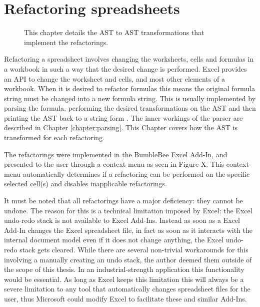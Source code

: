 \chapter{Refactoring spreadsheets}
\label{chapter:implementingrefactorings}

\noindent
\begin{figure}[h!]
\hspace*{0.003\textwidth}

\caption{This chapter details the AST to AST transformations that implement the refactorings.}
\end{figure}

Refactoring a spreadsheet involves changing the worksheets, cells and formulas in a workbook in such a way that the desired change is performed.
Excel provides an API to change the worksheet and cells, and most other elements of a workbook.
When it is desired to refactor formulas this means the original formula string must be changed into a new formula string.
This is usually implemented by parsing the formula, performing the desired transformations on the AST and then printing the AST back to a string form \cite{fowler1999refactoring}.
The inner workings of the parser are described in Chapter \ref{chapter:parsing}.
This Chapter covers how the AST is transformed for each refactoring.

The refactorings were implemented in the BumbleBee Excel Add-In, and presented to the user through a context menu as seen in Figure X.
This context-menu automatically determines if a refactoring can be performed on the specific selected cell(s) and disables inapplicable refactorings.

It must be noted that all refactorings have a major deficiency: they cannot be undone. \fw
The reason for this is a technical limitation imposed by Excel: the Excel undo-redo stack is not available to Excel Add-Ins.
Instead as soon as a Excel Add-In changes the Excel spreadsheet file, in fact as soon as it interacts with the internal document model even if it does not change anything, the Excel undo-redo stack gets cleared.
While there are several non-trivial workarounds for this involving a manually creating an undo stack, the author deemed them outside of the scope of this thesis.
In an industrial-strength application this functionality would be essential.
As long as Excel keeps this limitation this will always be a severe limitation to any tool that automatically changes spreadsheet files for the user, thus Microsoft could modify Excel to facilitate these and similar Add-Ins. \fw

